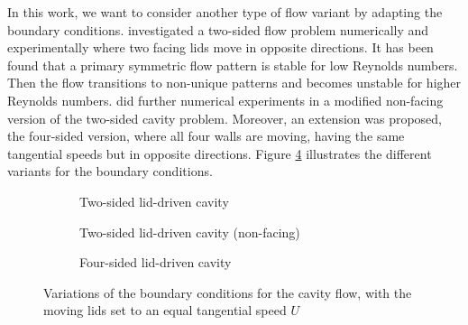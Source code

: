 In this work, we want to consider another type of flow variant by adapting the
boundary conditions. \cite{kuhlmann1997} investigated a two-sided flow problem
numerically and experimentally where two facing lids move in opposite
directions. It has been found that a primary symmetric flow pattern is stable
for low Reynolds numbers. Then the flow transitions to non-unique patterns and
becomes unstable for higher Reynolds numbers. \citet{wahba2009} did further
numerical experiments in a modified non-facing version of the two-sided cavity
problem. Moreover, an extension was proposed, the four-sided version, where all
four walls are moving, having the same tangential speeds but in opposite
directions. Figure \ref{fig:bc_types} illustrates the different variants for
the boundary conditions.

\begin{figure}[ht]
\centering
\begin{subfigure}[b]{0.3\textwidth}
  \centering
  \caption{Two-sided lid-driven cavity \\ \hspace{\textwidth}}
  \label{subfig:bc_2s}
\end{subfigure}
\begin{subfigure}[b]{0.3\textwidth}
  \centering
  \caption{Two-sided lid-driven cavity (non-facing)}
  \label{subfig:bc_2s_nf}
\end{subfigure}
\begin{subfigure}[b]{0.3\textwidth}
  \centering
  \caption{Four-sided lid-driven cavity \\ \hspace{\textwidth}}
  \label{subfig:bc_4s}
\end{subfigure}

\caption{Variations of the boundary conditions for the cavity flow,
 with the moving lids set to an equal tangential speed $U$}
\label{fig:bc_types}
\end{figure}

